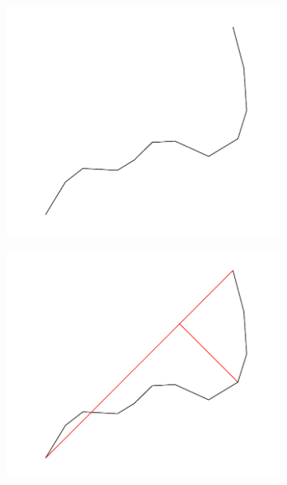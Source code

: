\begin{figure}[h]
    \centering %
\begin{subfigure}{0.5\textwidth}
  \includegraphics[width=\linewidth]{./pictures/4/douglas-peucker_1.pdf}
  \label{fig:3-douglas-peucker_1}
\end{subfigure}\hfil %
\begin{subfigure}{0.5\textwidth}
  \includegraphics[width=\linewidth]{./pictures/4/douglas-peucker_2.pdf}
  \label{fig:3-douglas-peucker_2}
\end{subfigure}\hfil %

\end{figure}
